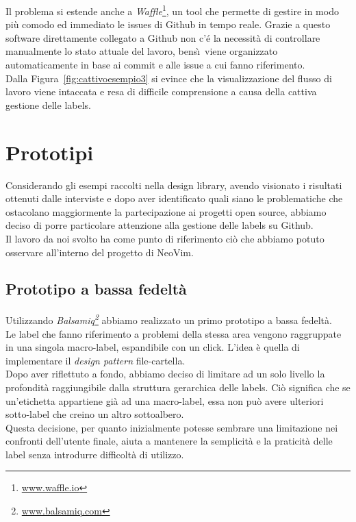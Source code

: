 \documentclass[12pt]{article} %
\begin{document}
Il problema si estende anche a \emph{Waffle}\footnote{\url{www.waffle.io}}, un tool che permette di gestire in modo pi\`u comodo ed immediato le issues di Github in tempo reale. Grazie a questo software direttamente collegato a Github non c'\'e la necessit\`a di controllare manualmente lo stato attuale del lavoro, bens\`\i\ viene organizzato automaticamente in base ai commit e alle issue a cui fanno riferimento.\\
Dalla Figura~\ref{fig:cattivoesempio3} si evince che la visualizzazione del flusso di lavoro viene intaccata e resa di difficile comprensione a causa della cattiva gestione delle labels.

\newpage

\section{Prototipi}
Considerando gli esempi raccolti nella design library, avendo visionato i risultati ottenuti dalle interviste e dopo aver identificato quali siano le problematiche che ostacolano maggiormente la partecipazione ai progetti open source, abbiamo deciso di porre particolare attenzione alla gestione delle labels su Github.\\
Il lavoro da noi svolto ha come punto di riferimento ci\`o che abbiamo potuto osservare all'interno del progetto di NeoVim.\\

\subsection{Prototipo a bassa fedelt\`a}
Utilizzando \emph{Balsamiq\footnote{\url{www.balsamiq.com}}} abbiamo realizzato un primo prototipo a bassa fedelt\`a.\\
Le label che fanno riferimento a problemi della stessa area vengono raggruppate in una singola macro-label, espandibile con un click. L'idea \`e quella di implementare il \emph{design pattern} file-cartella.\\
Dopo aver riflettuto a fondo, abbiamo deciso di limitare ad un solo livello la profondit\`a raggiungibile dalla struttura gerarchica delle labels. Ci\`o significa che se un'etichetta appartiene gi\`a ad una macro-label, essa non pu\`o avere ulteriori sotto-label che creino un altro sottoalbero.\\
Questa decisione, per quanto inizialmente potesse sembrare una limitazione nei confronti dell'utente finale, aiuta a mantenere la semplicit\`a e la praticit\`a delle label senza introdurre difficolt\`a di utilizzo.
\end{document}
